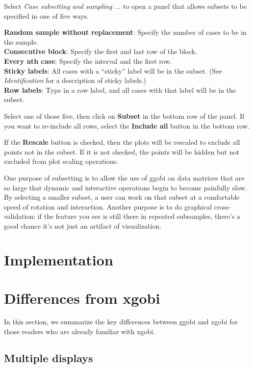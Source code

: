 \documentclass[11pt]{article}
\begin{document}
Select {\em Case subsetting and sampling ...} to open a panel
that allows subsets to be specified in one of five ways.

{\bf Random sample without replacement}:  Specify the number of
cases to be in the sample.
\\{\bf Consecutive block}:  Specify the first and last row of the block.
\\{\bf Every nth case}:  Specify the interval and the first row.
\\{\bf Sticky labels}:  All cases with a ``sticky'' label will
  be in the subset.  (See {\em Identification} for a description
  of sticky labels.)
\\{\bf Row labels}: Type in a row label, and all cases with that
  label will be in the subset.

Select one of those five, then click on {\bf Subset} in the
bottom row of the panel.  If you want to re-include all rows, 
select the {\bf Include all} button in the bottom row.

If the {\bf Rescale} button is checked, then the plots will be
rescaled to exclude all points not in the subset.  If it is
not checked, the points will be hidden but not excluded from
plot scaling operations.

One purpose of subsetting is to allow the use of ggobi on data matrices
that are so large that dynamic and interactive operations begin to
become painfully slow.  By selecting a smaller subset, a user can
work on that subset at a comfortable speed of rotation and
interaction.  Another purpose is to do graphical cross-validation:
if the feature you see is still there in repeated subsamples, there's
a good chance it's not just an artifact of visualization.

\section{Implementation}

\section{Differences from xgobi}
\label{slbl:xgobi}

In this section, we summarize the key differences between ggobi
and xgobi for those readers who are already familiar with xgobi.

\subsection {Multiple displays}
\end{document}
